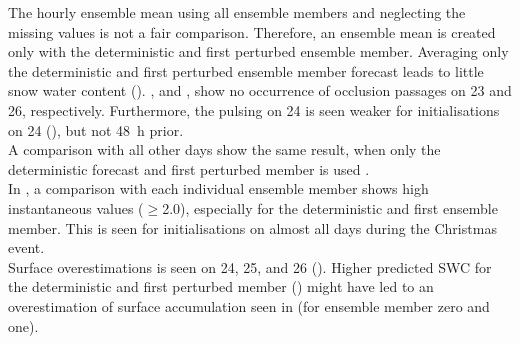 The hourly ensemble mean using all ensemble members and neglecting the missing values is not a fair comparison. Therefore, an ensemble mean is created only with the deterministic and first perturbed ensemble member. Averaging only the deterministic and first perturbed ensemble member forecast leads to little snow water content (). ,  and ,  show no occurrence of occlusion passages on \num{23} and \SI{26}{\dec}, respectively. Furthermore, the pulsing on \SI{24}{\dec} is seen weaker for initialisations on \SI{24}{\dec} (), but not \SI{48}{\hour} prior.
\\
A comparison with all other days show the same result, when only the deterministic forecast and first perturbed member is used . 
\\
In , a comparison with each individual ensemble member shows high instantaneous values ($\ge$\SI{2.0}{\SWC}), especially for the deterministic and first ensemble member. This is seen for initialisations on almost all days during the Christmas event. 
\\
Surface overestimations is seen on \num{24}, \num{25}, and \SI{26}{\dec} (). Higher predicted SWC for the deterministic and first perturbed member () might have led to an overestimation of surface accumulation seen in  (for ensemble member zero and one).
